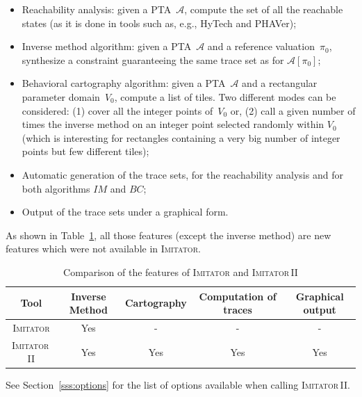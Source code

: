 \documentclass[a4paper,10pt]{article}
\newcommand{\A}{\mathcal{A}}
\newcommand{\IM}{\mathit{IM}}
\newcommand{\carto}{\mathit{BC}}
\newcommand{\hytech}{{\sc HyTech}}
\newcommand{\imitator}{\textsc{Imitator}}
\newcommand{\imitatordeux}{\textsc{Imitator}\,II}
\newcommand{\phaver}{PHAVer}
\begin{document}
\begin{itemize}
	\item Reachability analysis: given a PTA~$\A$, compute the set of all the reachable states (as it is done in tools such as, e.g., \hytech{} and \phaver{});
	\item Inverse method algorithm: given a PTA~$\A$ and a reference valuation~$\pi_0$, synthesize a constraint guaranteeing the same trace set as for $\A[\pi_0]$;
	\item Behavioral cartography algorithm: given a PTA~$\A$ and a rectangular parameter domain~$V_0$, compute a list of tiles. Two different modes can be considered: (1) cover all the integer points of~$V_0$ or, (2) call a given number of times the inverse method on an integer point selected randomly within $V_0$ (which is interesting for rectangles containing a very big number of integer points but few different tiles);
	\item Automatic generation of the trace sets, for the reachability analysis and for both algorithms $\IM$ and $\carto$;
	\item Output of the trace sets under a graphical form.
\end{itemize}

As shown in Table~\ref{table:features}, all those features (except the inverse method) are new features which were not available in \imitator{}.


\begin{table}[ht!]
{

\centering
\small

\begin{tabular}{| c || c | c | c | c |}
	\hline
	Tool & Inverse Method & Cartography & Computation of traces & Graphical output \\
	\hline
	\imitator{} & Yes & - & - & - \\
	\hline
	\imitatordeux{} & Yes & Yes & Yes & Yes\\
	\hline
\end{tabular}

}
\caption{Comparison of the features of \imitator{} and \imitatordeux{}}
\label{table:features}
\end{table}

See Section~\ref{sss:options} for the list of options available when calling \imitatordeux{}.
\end{document}
